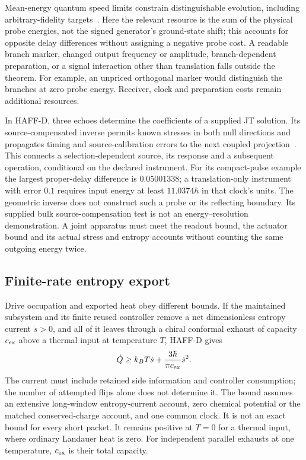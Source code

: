 \documentclass[aps,pre,onecolumn,superscriptaddress,floatfix,longbibliography]{revtex4-2}
\begin{document}
Mean-energy quantum speed limits constrain distinguishable evolution, including
arbitrary-fidelity targets~\cite{MargolusLevitin1998,HornedalSonnerborn2023}.
Here the relevant resource is the
sum of the physical probe energies, not the signed generator's ground-state
shift; this accounts for opposite delay differences without assigning a negative
probe cost. A readable branch marker, changed output frequency or amplitude,
branch-dependent preparation, or a signal interaction other than translation
falls outside the theorem. For example, an unpriced orthogonal marker would
distinguish the branches at zero probe energy. Receiver, clock and preparation
costs remain additional resources.

In HAFF-D, three echoes determine the coefficients of a supplied JT solution.
Its source-compensated inverse permits known stresses in both null directions
and propagates timing and source-calibration errors to the next coupled
projection~\cite{Liu2026HAFFD}. This connects a selection-dependent source, its
response and a subsequent operation, conditional on the declared instrument.
For its compact-pulse example the largest proper-delay difference is
$0.05001338$; a translation-only instrument with error $0.1$ requires input
energy at least $11.0374\hbar$ in that clock's units. The geometric inverse does
not construct such a probe or its reflecting boundary. Its supplied bulk
source-compensation test is not an energy--resolution demonstration. A joint
apparatus must meet the readout bound, the actuator bound and its actual stress
and entropy accounts without counting the same outgoing energy twice.

\subsection{Finite-rate entropy export}

Drive occupation and exported heat obey different bounds. If the maintained
subsystem and its finite reused controller remove a net dimensionless entropy
current $\dot s>0$, and all of it leaves through a chiral conformal exhaust of
capacity $c_{\rm ex}$ above a thermal input at temperature $T$, HAFF-D gives
\cite{Liu2026HAFFD}
\[
 \dot Q\ge k_BT\dot s+\frac{3\hbar}{\pi c_{\rm ex}}\dot s^2.
\]
The current must include retained side information and controller consumption;
the number of attempted flips alone does not determine it. The bound assumes
an extensive long-window entropy-current account, zero chemical potential or
the matched conserved-charge account, and one common clock. It is not an exact
bound for every short packet. It remains positive at $T=0$ for a thermal input,
where ordinary Landauer heat is zero. For independent parallel exhausts at one
temperature, $c_{\rm ex}$ is their total capacity.
\end{document}
